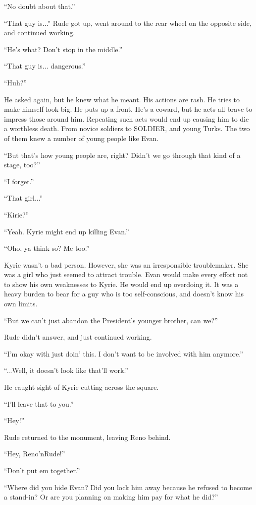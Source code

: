 \documentclass[oneside]{book}
\begin{document}
“No doubt about that.”

“That guy is...” Rude got up, went around to the rear wheel on the opposite side, and continued working.

“He’s what? Don’t stop in the middle.”

“That guy is... dangerous.”

“Huh?”

He asked again, but he knew what he meant. His actions are rash. He tries to make himself look big. He puts up a front. He’s a coward, but he acts all brave to impress those around him. Repeating such acts would end up causing him to die a worthless death. From novice soldiers to SOLDIER, and young Turks. The two of them knew a number of young people like Evan.

“But that’s how young people are, right? Didn’t we go through that kind of a stage, too?”

“I forget.”

“That girl...”

“Kirie?”

“Yeah. Kyrie might end up killing Evan.”

“Oho, ya think so? Me too.”

Kyrie wasn’t a bad person. However, she was an irresponsible troublemaker. She was a girl who just seemed to attract trouble. Evan would make every effort not to show his own weaknesses to Kyrie. He would end up overdoing it. It was a heavy burden to bear for a guy who is too self-conscious, and doesn’t know his own limits.

“But we can’t just abandon the President’s younger brother, can we?”

Rude didn’t answer, and just continued working.

“I’m okay with just doin’ this. I don’t want to be involved with him anymore.”

“...Well, it doesn’t look like that’ll work.”

He caught sight of Kyrie cutting across the square.

“I’ll leave that to you.”

“Hey!”

Rude returned to the monument, leaving Reno behind.

“Hey, Reno’nRude!”

“Don’t put em together.”

“Where did you hide Evan? Did you lock him away because he refused to become a stand-in? Or are you planning on making him pay for what he did?”
\end{document}

